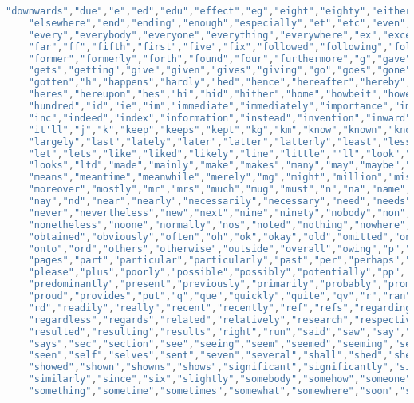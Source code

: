 \documentclass[12pt,a4paper]{scrartcl}
\begin{document}
\begin{lstlisting}[language=C++, basicstyle=\scriptsize]
    "downwards","due","e","ed","edu","effect","eg","eight","eighty","either","else",
    "elsewhere","end","ending","enough","especially","et","etc","even","ever",
    "every","everybody","everyone","everything","everywhere","ex","except","f",
    "far","ff","fifth","first","five","fix","followed","following","follows",
    "former","formerly","forth","found","four","furthermore","g","gave","get",
    "gets","getting","give","given","gives","giving","go","goes","gone","got",
    "gotten","h","happens","hardly","hed","hence","hereafter","hereby","herein",
    "heres","hereupon","hes","hi","hid","hither","home","howbeit","however",
    "hundred","id","ie","im","immediate","immediately","importance","important",
    "inc","indeed","index","information","instead","invention","inward","itd",
    "it'll","j","k","keep","keeps","kept","kg","km","know","known","knows","l",
    "largely","last","lately","later","latter","latterly","least","less","lest",
    "let","lets","like","liked","likely","line","little","'ll","look","looking",
    "looks","ltd","made","mainly","make","makes","many","may","maybe","mean",
    "means","meantime","meanwhile","merely","mg","might","million","miss","ml",
    "moreover","mostly","mr","mrs","much","mug","must","n","na","name","namely",
    "nay","nd","near","nearly","necessarily","necessary","need","needs","neither",
    "never","nevertheless","new","next","nine","ninety","nobody","non","none",
    "nonetheless","noone","normally","nos","noted","nothing","nowhere","obtain",
    "obtained","obviously","often","oh","ok","okay","old","omitted","one","ones",
    "onto","ord","others","otherwise","outside","overall","owing","p","page",
    "pages","part","particular","particularly","past","per","perhaps","placed",
    "please","plus","poorly","possible","possibly","potentially","pp",
    "predominantly","present","previously","primarily","probably","promptly",
    "proud","provides","put","q","que","quickly","quite","qv","r","ran","rather",
    "rd","readily","really","recent","recently","ref","refs","regarding",
    "regardless","regards","related","relatively","research","respectively",
    "resulted","resulting","results","right","run","said","saw","say","saying",
    "says","sec","section","see","seeing","seem","seemed","seeming","seems",
    "seen","self","selves","sent","seven","several","shall","shed","shes","show",
    "showed","shown","showns","shows","significant","significantly","similar",
    "similarly","since","six","slightly","somebody","somehow","someone","somethan",
    "something","sometime","sometimes","somewhat","somewhere","soon","sorry",

\end{lstlisting}
\end{document}
